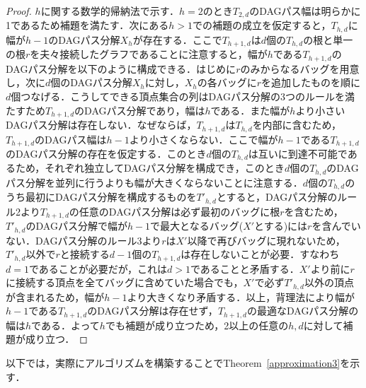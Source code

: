 \documentclass[master]{kuisthesis}		%
\theoremstyle{plain}
\theoremstyle{definition}
\begin{document}
\begin{proof}
    $h$に関する数学的帰納法で示す．$h=2$のとき$T_{2, d}$のDAGパス幅は明らかに1であるため補題を満たす．次にある$h > 1$での補題の成立を仮定すると，$T_{h, d}$に幅が$h-1$のDAGパス分解$X_h$が存在する．ここで$T_{h+1, d}$は$d$個の$T_{h, d}$の根と単一の根$r$を夫々接続したグラフであることに注意すると，幅が$h$である$T_{h+1, d}$のDAGパス分解を以下のように構成できる．はじめに$r$のみからなるバッグを用意し，次に$d$個のDAGパス分解$X_h$に対し，$X_h$の各バッグに$r$を追加したものを順に$d$個つなげる．こうしてできる頂点集合の列はDAGパス分解の3つのルールを満たすため$T_{h+1, d}$のDAGパス分解であり，幅は$h$である．また幅が$h$より小さいDAGパス分解は存在しない．なぜならば，$T_{h+1, d}$は$T_{h, d}$を内部に含むため，$T_{h+1, d}$のDAGパス幅は$h-1$より小さくならない．ここで幅が$h-1$である$T_{h+1, d}$のDAGパス分解の存在を仮定する．このとき$d$個の$T_{h, d}$は互いに到達不可能であるため，それぞれ独立してDAGパス分解を構成でき，このとき$d$個の$T_{h, d}$のDAGパス分解を並列に行うよりも幅が大きくならないことに注意する．$d$個の$T_{h, d}$のうち最初にDAGパス分解を構成するものを$T'_{h, d}$とすると，DAGパス分解のルール2より$T_{h+1, d}$の任意のDAGパス分解は必ず最初のバッグに根$r$を含むため，$T'_{h, d}$のDAGパス分解で幅が$h-1$で最大となるバッグ($X'$とする)には$r$を含んでいない．DAGパス分解のルール3より$r$は$X'$以降で再びバッグに現れないため，$T'_{h, d}$以外で$r$と接続する$d-1$個の$T_{h+1, d}$は存在しないことが必要．すなわち$d=1$であることが必要だが，これは$d > 1$であることと矛盾する．$X'$より前に$r$に接続する頂点を全てバッグに含めていた場合でも，$X'$で必ず$T'_{h, d}$以外の頂点が含まれるため，幅が$h-1$より大きくなり矛盾する．以上，背理法により幅が$h-1$である$T_{h+1, d}$のDAGパス分解は存在せず，$T_{h+1, d}$の最適なDAGパス分解の幅は$h$である．よって$h$でも補題が成り立つため，2以上の任意の$h, d$に対して補題が成り立つ．
\end{proof}


以下では，実際にアルゴリズムを構築することでTheorem~\ref{approximation3}を示す．
\end{document}
